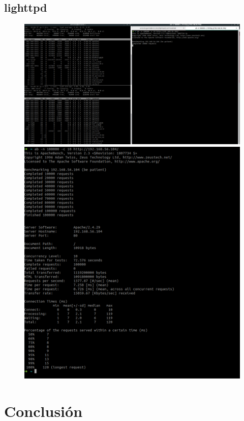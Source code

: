 \documentclass[12pt]{article}
\begin{document}
\subsection{lighttpd}

\begin{figure}[H]
\center
\includegraphics[scale=0.2]{30.png}
\includegraphics[scale=0.3]{31.png}
\end{figure}

\newpage

\section{Conclusión}
\end{document}
